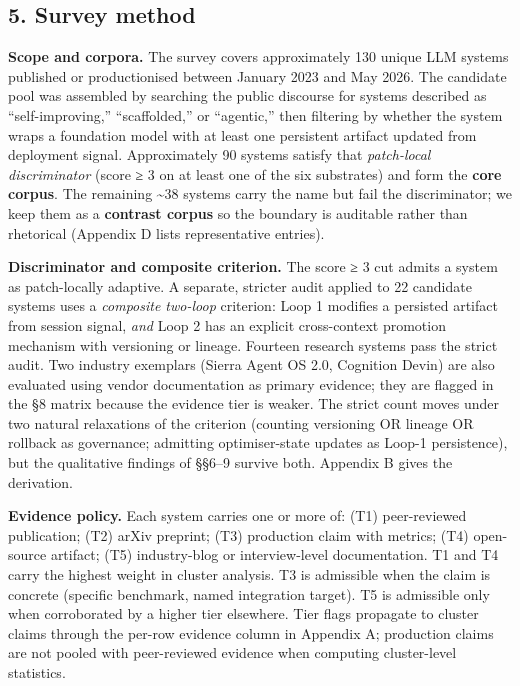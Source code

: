 \subsection{5. Survey method}\label{survey-method}

\textbf{Scope and corpora.} The survey covers approximately 130 unique
LLM systems published or productionised between January 2023 and May
2026. The candidate pool was assembled by searching the public discourse
for systems described as ``self-improving,'' ``scaffolded,'' or
``agentic,'' then filtering by whether the system wraps a foundation
model with at least one persistent artifact updated from deployment
signal. Approximately 90 systems satisfy that \emph{patch-local
discriminator} (score ≥ 3 on at least one of the six substrates) and
form the \textbf{core corpus}. The remaining \textasciitilde38 systems
carry the name but fail the discriminator; we keep them as a
\textbf{contrast corpus} so the boundary is auditable rather than
rhetorical (Appendix D lists representative entries).

\textbf{Discriminator and composite criterion.} The score ≥ 3 cut admits
a system as patch-locally adaptive. A separate, stricter audit applied
to 22 candidate systems uses a \emph{composite two-loop} criterion: Loop
1 modifies a persisted artifact from session signal, \emph{and} Loop 2
has an explicit cross-context promotion mechanism with versioning or
lineage. Fourteen research systems pass the strict audit. Two industry
exemplars (Sierra Agent OS 2.0, Cognition Devin) are also evaluated
using vendor documentation as primary evidence; they are flagged in the
§8 matrix because the evidence tier is weaker. The strict count moves
under two natural relaxations of the criterion (counting versioning OR
lineage OR rollback as governance; admitting optimiser-state updates as
Loop-1 persistence), but the qualitative findings of §§6--9 survive
both. Appendix B gives the derivation.

\textbf{Evidence policy.} Each system carries one or more of: (T1)
peer-reviewed publication; (T2) arXiv preprint; (T3) production claim
with metrics; (T4) open-source artifact; (T5) industry-blog or
interview-level documentation. T1 and T4 carry the highest weight in
cluster analysis. T3 is admissible when the claim is concrete (specific
benchmark, named integration target). T5 is admissible only when
corroborated by a higher tier elsewhere. Tier flags propagate to cluster
claims through the per-row evidence column in Appendix A; production
claims are not pooled with peer-reviewed evidence when computing
cluster-level statistics.

